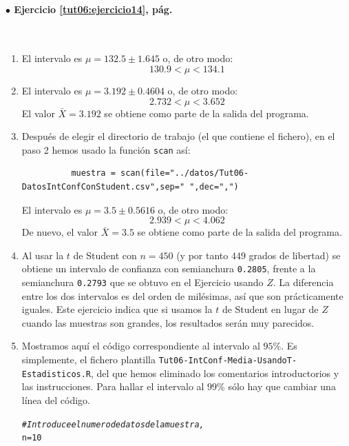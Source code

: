 \documentclass[10pt,a4paper]{article}\usepackage[]{graphicx}\usepackage[]{color}
\makeatletter
\newcommand{\hlnum}[1]{\textcolor[rgb]{0.686,0.059,0.569}{#1}}%
\newcommand{\hlcom}[1]{\textcolor[rgb]{0.678,0.584,0.686}{\textit{#1}}}%
\newcommand{\hlstd}[1]{\textcolor[rgb]{0.345,0.345,0.345}{#1}}%
\newcommand{\hlkwb}[1]{\textcolor[rgb]{0.69,0.353,0.396}{#1}}%
\newenvironment{kframe}{%
 \def\at@end@of@kframe{}%
 \ifinner\ifhmode%
  \def\at@end@of@kframe{\end{minipage}}%
  \begin{minipage}{\columnwidth}%
 \fi\fi%
 \def\FrameCommand##1{\hskip\@totalleftmargin \hskip-\fboxsep
 \colorbox{shadecolor}{##1}\hskip-\fboxsep
     \hskip-\linewidth \hskip-\@totalleftmargin \hskip\columnwidth}%
 \MakeFramed {\advance\hsize-\width
   \@totalleftmargin\z@ \linewidth\hsize
   \@setminipage}}%
 {\par\unskip\endMakeFramed%
 \at@end@of@kframe}
\newenvironment{knitrout}{}{} %
\newcounter {cont01}
\makeatother
\begin{document}
\paragraph{\bf $\bullet$ Ejercicio \ref{tut06:ejercicio14}, pág. \pageref{tut06:ejercicio14}}
\label{tut06:ejercicio14:sol}\quad\\

\begin{enumerate}
  \item El intervalo es $\mu =  132.5\pm 1.645$ o, de otro modo:
    \[ 130.9 < \mu < 134.1\]

  \item El intervalo es $\mu = 3.192 \pm 0.4604$ o, de otro modo:
  \[ 2.732  < \mu < 3.652\]
  El valor $\bar X = 3.192$ se obtiene como parte de la salida del programa.

  \item Después de elegir el directorio de trabajo (el que contiene el fichero), en el paso 2 hemos usado la función {\tt scan} así:
        \begin{verbatim}
          muestra = scan(file="../datos/Tut06-DatosIntConfConStudent.csv",sep=" ",dec=",")
        \end{verbatim}

  El intervalo es $\mu = 3.5 \pm 0.5616$ o, de otro modo:
  \[ 2.939  < \mu < 4.062\]
  De nuevo, el valor $\bar X = 3.5$ se obtiene como parte de la salida del programa.

  \item Al usar la $t$ de Student con $n=450$ (y por tanto $449$ grados de libertad) se obtiene un intervalo de confianza con semianchura {\tt 0.2805}, frente a la semianchura {\tt 0.2793} que se obtuvo en el Ejercicio usando $Z$. La diferencia entre los dos intervalos es del orden de milésimas, así que son prácticamente iguales. Este ejercicio indica que si usamos la $t$ de Student en lugar de $Z$ cuando las muestras son grandes, los resultados serán muy parecidos.

\item Mostramos aquí el código correspondiente al intervalo al $95\%$. Es simplemente, el fichero plantilla {\tt Tut06-IntConf-Media-UsandoT-Estadisticos.R}, del que hemos eliminado los comentarios introductorios y las instrucciones. Para hallar el intervalo al $99\%$ sólo hay que cambiar  una línea del código.
\begin{knitrout}
\color{fgcolor}\begin{kframe}
\begin{alltt}
\hlcom{# Introduce el numero de datos de la muestra,}
\hlstd{n} \hlkwb{=} \hlnum{10}


\end{alltt}
\end{kframe}
\end{knitrout}
\end{enumerate}
\end{document}
